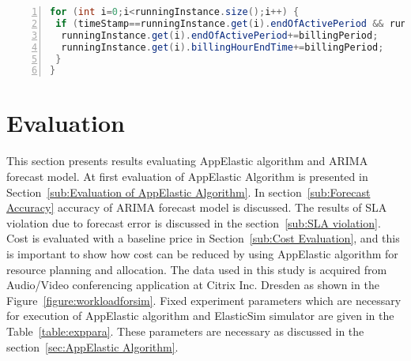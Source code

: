\begin{lstlisting}[language=java,caption=AppElastic No scale/extend VM,label=list:appelasticnoscale,numbers=left,frame=single,fontadjust=true,breaklines,basicstyle=\small]
for (int i=0;i<runningInstance.size();i++) {
 if (timeStamp==runningInstance.get(i).endOfActivePeriod && runningInstance.get(i).canExtend) {
  runningInstance.get(i).endOfActivePeriod+=billingPeriod;
  runningInstance.get(i).billingHourEndTime+=billingPeriod;
 }
}
\end{lstlisting}

\section{Evaluation}
\label{sec:Evaluation}
This section presents results evaluating AppElastic algorithm and ARIMA forecast model. At first evaluation of AppElastic Algorithm is presented in Section~\ref{sub:Evaluation of AppElastic Algorithm}. In section~\ref{sub:Forecast Accuracy} accuracy of ARIMA forecast model is discussed. The results of SLA violation due to forecast error is discussed in the section~\ref{sub:SLA violation}. Cost is evaluated with a baseline price in Section~\ref{sub:Cost Evaluation}, and this is important to show how cost can be reduced by using AppElastic algorithm for resource planning and allocation. The data used in this study is acquired from Audio/Video conferencing application at Citrix Inc. Dresden as shown in the Figure~\ref{figure:workloadforsim}. Fixed experiment parameters which are necessary for execution of AppElastic algorithm and ElasticSim simulator are given in the Table~\ref{table:exppara}. These parameters are necessary as discussed in the section~\ref{sec:AppElastic Algorithm}.

\begin{center}
  \begin{table}
    \caption{ Fixed experiment parameters}
     \label{table:exppara}
\end{table}
\end{center}

